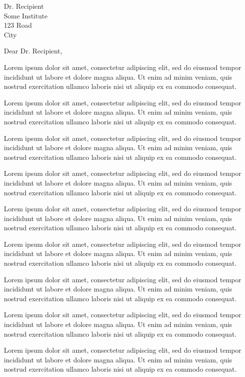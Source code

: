 \documentclass{letter}
\begin{document}
\begin{letter}{Dr. Recipient \\ Some Institute \\ 123 Road \\ City}
\opening{Dear Dr. Recipient,}

Lorem ipsum dolor sit amet, consectetur adipiscing elit, sed do eiusmod tempor incididunt ut labore et dolore magna aliqua. Ut enim ad minim veniam, quis nostrud exercitation ullamco laboris nisi ut aliquip ex ea commodo consequat.

Lorem ipsum dolor sit amet, consectetur adipiscing elit, sed do eiusmod tempor incididunt ut labore et dolore magna aliqua. Ut enim ad minim veniam, quis nostrud exercitation ullamco laboris nisi ut aliquip ex ea commodo consequat.

Lorem ipsum dolor sit amet, consectetur adipiscing elit, sed do eiusmod tempor incididunt ut labore et dolore magna aliqua. Ut enim ad minim veniam, quis nostrud exercitation ullamco laboris nisi ut aliquip ex ea commodo consequat.

Lorem ipsum dolor sit amet, consectetur adipiscing elit, sed do eiusmod tempor incididunt ut labore et dolore magna aliqua. Ut enim ad minim veniam, quis nostrud exercitation ullamco laboris nisi ut aliquip ex ea commodo consequat.

Lorem ipsum dolor sit amet, consectetur adipiscing elit, sed do eiusmod tempor incididunt ut labore et dolore magna aliqua. Ut enim ad minim veniam, quis nostrud exercitation ullamco laboris nisi ut aliquip ex ea commodo consequat.

Lorem ipsum dolor sit amet, consectetur adipiscing elit, sed do eiusmod tempor incididunt ut labore et dolore magna aliqua. Ut enim ad minim veniam, quis nostrud exercitation ullamco laboris nisi ut aliquip ex ea commodo consequat.

Lorem ipsum dolor sit amet, consectetur adipiscing elit, sed do eiusmod tempor incididunt ut labore et dolore magna aliqua. Ut enim ad minim veniam, quis nostrud exercitation ullamco laboris nisi ut aliquip ex ea commodo consequat.

Lorem ipsum dolor sit amet, consectetur adipiscing elit, sed do eiusmod tempor incididunt ut labore et dolore magna aliqua. Ut enim ad minim veniam, quis nostrud exercitation ullamco laboris nisi ut aliquip ex ea commodo consequat.

Lorem ipsum dolor sit amet, consectetur adipiscing elit, sed do eiusmod tempor incididunt ut labore et dolore magna aliqua. Ut enim ad minim veniam, quis nostrud exercitation ullamco laboris nisi ut aliquip ex ea commodo consequat.


\end{letter}
\end{document}
